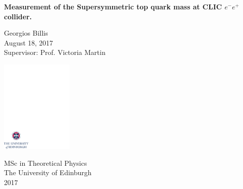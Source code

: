 \documentclass[12pt,a4paper]{report}
\begin{document}
\thispagestyle{empty}

%
\parindent=10pt          %
\parskip=5pt            %
%
%

\vspace*{0.1\textheight}

\begin{center}
        \huge{\bfseries Measurement of the Supersymmetric top quark mass at CLIC $e^{-}e^{+}$ collider.}\\
\end{center}

\bigskip

\begin{center}
        \large{Georgios Billis}\\      %
        \bigskip
        \large{August 18, 2017}\\        %
        \bigskip
        \large{Supervisor: Prof. Victoria Martin}        %

\end{center}

\vspace*{0.35\textheight}

\begin{center}
        \includegraphics[width=35mm]{crest.pdf}
\end{center}

\medskip

\begin{center}

\large{
  MSc in Theoretical Physics\\[0.8ex]
  The University of Edinburgh\\[0.8ex]
  2017
}

\end{center}
\end{document}
